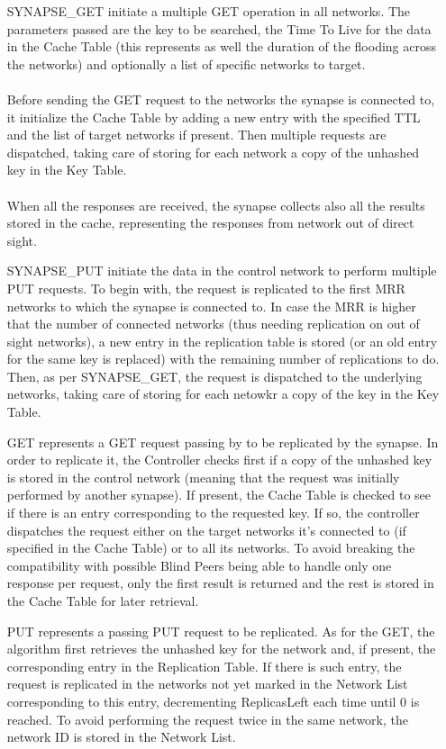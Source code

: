 \begin{itemize}
\item[SYNAPSE\_GET] initiate a multiple GET operation in all networks. The parameters passed are the key to be searched, the Time To Live for
the data in the Cache Table (this represents as well the duration of the flooding across the networks) and optionally a list of specific networks to target.
\\~\\
Before sending the GET request to the networks the synapse is connected to, it initialize the Cache Table by adding a new entry with the specified TTL and the list of target networks if present. Then multiple requests are dispatched, taking care of storing for each network a copy of the unhashed key in the Key Table.
\\~\\
When all the responses are received, the synapse collects also all the results stored in the cache, representing the responses from network out of direct sight.
\item[SYNAPSE\_PUT] initiate the data in the control network to perform multiple PUT requests. To begin with, the request is replicated to the first MRR networks to which the synapse is connected to. In case the MRR is higher that the number of connected networks (thus needing replication on out of sight networks), a new entry in the replication table is stored (or an old entry for the same key is replaced) with the remaining number of replications to do. Then, as per SYNAPSE\_GET, the request is dispatched to the underlying networks, taking care of storing for each netowkr a copy of the key in the Key Table.
\item[GET] represents a GET request passing by to be replicated by the synapse. In order to replicate it, the Controller checks first if a copy of the unhashed key is stored in the control network (meaning that the request was initially performed by another synapse). If present, the Cache Table is checked to see if there is an entry corresponding to the requested key. If so, the controller dispatches the request either on the target networks it's connected to (if specified in the Cache Table) or to all its networks. To avoid breaking the compatibility with possible Blind Peers being able to handle only one response per request, only the first result is returned and the rest is stored in the Cache Table for later retrieval.
\item[PUT] represents a passing PUT request to be replicated. As for the GET, the algorithm first retrieves the unhashed key for the network and, if present, the corresponding entry in the Replication Table. If there is such entry, the request is replicated in the networks not yet marked in the Network List corresponding to this entry, decrementing ReplicasLeft each time until 0 is reached. To avoid performing the request twice in the same network, the network ID is stored in the Network List.
\end{itemize}

